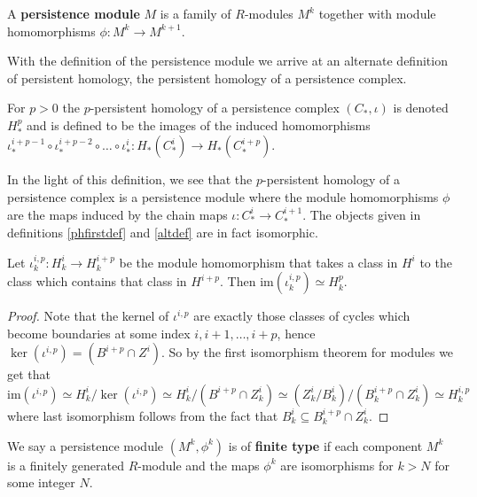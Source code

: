 \begin{definition}
  A \textbf{persistence module} $M$ is a family of $R$-modules $M^{k}$ together with module homomorphisms $\phi: M^{k} \to M^{k+1}$.
\end{definition}
With the definition of the persistence module we arrive at an alternate definition of persistent homology, the persistent homology of a persistence complex.
\begin{definition}\label{altdef} For $p>0$ the $p$-persistent homology of a persistence complex $(C_{*}, \iota)$ is denoted $H^{p}_{*}$ and is defined to be the images of the induced homomorphisms $\iota^{i+p-1}_{*} \circ \iota^{i+p-2}_{*} \circ \dots \circ \iota^{i}_{*}: H_{*}(C_{*}^{i}) \to H_{*}(C^{i+p}_{*})$.
\end{definition}
In the light of this definition, we see that the $p$-persistent homology of a persistence complex is a persistence module where the module homomorphisms $\phi$ are the maps induced by the chain maps $\iota: C^{i}_{*} \to C_{*}^{i+1}$. The objects given in definitions \ref{phfirstdef} and \ref{altdef} are in fact isomorphic.
\begin{lemma}
Let $\iota^{i,p}_k: H^{i}_{k} \to H^{i+p}_{k}$ be the module homomorphism that takes a class in $H^{i}$ to the class which contains that class in $H^{i+p}$. Then $\text{im} (\iota^{i,p}_{k}) \simeq H^{p}_{k}$.
\end{lemma}
\begin{proof}
  Note that the kernel of $\iota^{{i,p}}$ are exactly those classes of cycles which become boundaries at some index $i,i+1,\dots,i+p$, hence $\ker (\iota^{i,p}) = (B^{i+p} \cap Z^{i})$. So by the first isomorphism theorem for modules we get that
  \[ \text{im}(\iota^{i,p}) \simeq H^{i}_{k} / \ker(\iota^{i,p}) \simeq H^{i}_{k} / (B^{i+p} \cap Z_{k}^{i}) \simeq (Z^{i}_{k}/B^{i}_{k})/(B^{i+p}_{k}\cap Z^{i}_{k}) \simeq H^{i,p}_{k} \]
  where last isomorphism follows from the fact that $B^{i}_{k} \subseteq B_{k}^{i+p} \cap Z^{i}_{k}$.
\end{proof}

\begin{definition}
We say a persistence module $(M^{k}, \phi^{k})$ is of \textbf{finite type} if each component $M^{k}$ is a finitely generated $R$-module and the maps $\phi^{k}$ are isomorphisms for $k > N$ for some integer $N$.
\end{definition}

